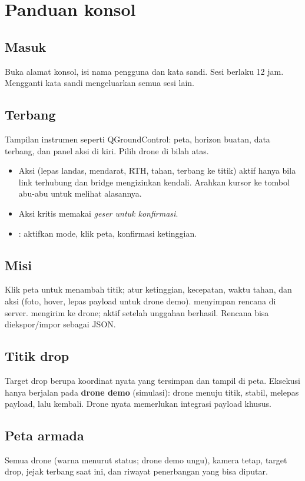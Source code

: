 \chapter{Panduan konsol}
\section{Masuk}
Buka alamat konsol, isi nama pengguna dan kata sandi. Sesi berlaku 12 jam. Mengganti kata sandi mengeluarkan semua sesi lain.

\section{Terbang}
Tampilan instrumen seperti QGroundControl: peta, horizon buatan, data terbang, dan panel aksi di kiri. Pilih drone di bilah atas.
\begin{itemize}
\item Aksi (lepas landas, mendarat, RTH, tahan, terbang ke titik) aktif hanya bila link terhubung dan bridge mengizinkan kendali. Arahkan kursor ke tombol abu-abu untuk melihat alasannya.
\item Aksi kritis memakai \emph{geser untuk konfirmasi}.
\item {}: aktifkan mode, klik peta, konfirmasi ketinggian.
\end{itemize}

\section{Misi}
Klik peta untuk menambah titik; atur ketinggian, kecepatan, waktu tahan, dan aksi (foto, hover, lepas payload untuk drone demo).  menyimpan rencana di server.  mengirim ke drone;  aktif setelah unggahan berhasil. Rencana bisa diekspor/impor sebagai JSON.

\section{Titik drop}
Target drop berupa koordinat nyata yang tersimpan dan tampil di peta. Eksekusi hanya berjalan pada \textcolor{demo}{\textbf{drone demo}} (simulasi): drone menuju titik, stabil, melepas payload, lalu kembali. Drone nyata memerlukan integrasi payload khusus.

\section{Peta armada}
Semua drone (warna menurut status; drone demo ungu), kamera tetap, target drop, jejak terbang saat ini, dan riwayat penerbangan yang bisa diputar.

